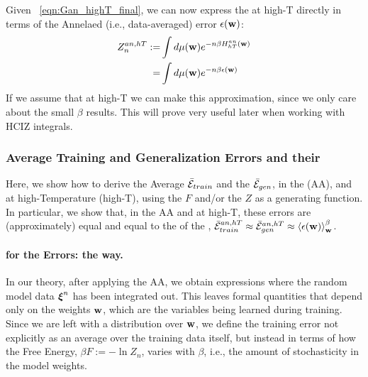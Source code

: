 Given \EQN~\ref{eqn:Gan_highT_final}, we can now express the \Annealed \PartitionFunction at high-T directly in terms of
the Annelaed (i.e., data-averaged) error $\epsilon({\mathbf{w}})$:
\begin{align}
  \nonumber
  \label{eqn:Zanht_def}
Z^{an,hT}_{n} :=  &\int d\mu({\mathbf{w}}) e^{-n\beta H^{an}_{hT}({\mathbf{w}})} \\ 
  =  &\int d\mu({\mathbf{w}}) e^{-n\beta\epsilon({\mathbf{w}})} 
\end{align}
If we assume that at high-T we can make this approximation, 
since we only care about the small $\beta$ results. 
This will prove very useful later when working with HCIZ integrals.


\subsubsection{Average Training and Generalization Errors and their \GeneratingFunctions}
\label{sxn:mathP_errors}


Here, we show how to derive the Average \TrainingError $\bar{\mathcal{E}}_{train}$ and  the \AverageGeneralizationError $\bar{\mathcal{E}}_{gen}$,
in the \AnnealedApproximation (AA), and at high-Temperature (high-T), using the \FreeEnergy $F$ and/or the \PartitionFunction $Z$ as
a generating function.  
In particular, we show that, in the AA and at high-T, these errors are (approximately) equal
and equal to the \ThermalAverage of the \EffectivePotential,
$\bar{\mathcal{E}}_{train}^{an, hT} \approx \bar{\mathcal{E}}_{gen}^{an, hT} \approx \left\langle \epsilon({\mathbf{w}}) \right\rangle_{\mathbf w}^{\beta}$.


\paragraph{\GeneratingFunctions for the Errors: the \STATMECH way.}
In our theory, after applying the AA, we obtain expressions where the random model data $\boldsymbol{\xi}^{n}$ has been integrated out. This leaves formal quantities that depend only on the weights ${\mathbf{w}}$, which are the variables being learned during training.
Since we are left with a distribution over ${\mathbf{w}}$, we define the training error not explicitly as an average over the training data itself, but instead in terms of how the Free Energy, $\beta F :=-\ln Z_{n}$, varies with $\beta$, i.e., the amount of stochasticity in the model weights.

